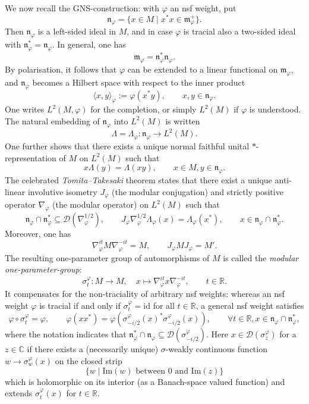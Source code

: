 \documentclass[11pt, reqno]{amsart}
\theoremstyle{definition}
\numberwithin{equation}{section}
\def\C{\mathbb C}
\def\msD{\mathscr D}
\def\R{\mathbb R}
\newcommand{\id}{\mathrm{id}}
\newcommand{\Imm}{\mathrm{Im}}
\newcommand{\mfm}{\mathfrak{m}}
\newcommand{\mfn}{\mathfrak{n}}
\begin{document}
We now recall the GNS-construction: with $\varphi$ an nsf weight, put 
\[
\mfn_{\varphi} = \{x\in M \mid x^*x\in \mfm_{\varphi}^+\}. 
\]
Then $\mfn_{\varphi}$ is a left-sided ideal in $M$, and in case $\varphi$ is tracial also a two-sided ideal with $\mfn_{\varphi}^* = \mfn_{\varphi}$. In general, one has 
\[
\mfm_{\varphi}= \mfn_{\varphi}^*\mfn_{\varphi}. 
\]
By polarisation, it follows that $\varphi$ can be extended to a linear functional on $\mfm_{\varphi}$, and $\mfn_{\varphi}$ becomes a Hilbert space with respect to the inner product 
\[
\langle x,y \rangle_{\varphi} :=\varphi(x^*y),\qquad x,y\in \mfn_{\varphi}.
\]
One writes $L^2(M,\varphi)$ for the completion, or simply $L^2(M)$ if $\varphi$ is understood. The natural embedding of $\mfn_{\varphi}$ into $L^2(M)$ is written 
\[
\Lambda = \Lambda_{\varphi}\colon  \mfn_{\varphi} \rightarrow L^2(M). 
\]
One further shows that there exists a unique normal faithful unital $*$-representation of $M$ on $L^2(M)$ such that 
\[
x\Lambda(y) = \Lambda(xy),\qquad x\in M,y\in \mfn_{\varphi}. 
\]
The celebrated \emph{Tomita--Takesaki} theorem states that there exist a unique anti-linear involutive isometry $J_{\varphi}$ (the modular conjugation) and strictly positive operator $\nabla_{\varphi}$ (the modular operator) on $L^2(M)$ such that 
\[
\mfn_{\varphi}\cap \mfn_{\varphi}^* \subseteq \msD(\nabla_{\varphi}^{1/2}),\qquad J_{\varphi}\nabla_{\varphi}^{1/2}\Lambda_{\varphi}(x) = \Lambda_{\varphi}(x^*),\qquad x\in \mfn_{\varphi}\cap \mfn_{\varphi}^*.
\]
Moreover, one has 
\[
\nabla_{\varphi}^{it}M\nabla_{\varphi}^{-it} = M,\qquad J_{\varphi} M J_{\varphi} = M'. 
\]
The resulting one-parameter group of automorphisms of $M$ is called the \emph{modular} \emph{one-parameter-group}: 
\[
\sigma_t^{\varphi}\colon  M \rightarrow M,\quad x \mapsto \nabla_{\varphi}^{it}x\nabla_{\varphi}^{-it},\qquad t\in \R. 
\]
It compensates for the non-traciality of arbitrary nsf weights: whereas an nsf weight $\varphi$ is tracial if and only if $\sigma_t^{\varphi} = \id$ for all $t\in \R$, a general nsf weight satisfies
\[
\varphi \circ \sigma_t^{\varphi}= \varphi,\qquad \varphi(xx^*) = \varphi(\sigma_{-i/2}^{\varphi}(x)^*\sigma_{-i/2}^{\varphi}(x)),\qquad \forall t\in \R,x\in \mfn_{\varphi}\cap \mfn_{\varphi}^*,
\]
where the notation indicates that $\mfn_{\varphi}^*\cap\mfn_{\varphi} \subseteq \msD(\sigma_{-i/2}^{\varphi})$. Here $x\in \msD(\sigma_{z}^{\varphi})$ for a $z\in \C$ if there exists a (necessarily unique) $\sigma$-weakly continuous function $w \rightarrow \sigma_w^{\varphi}(x)$ on the closed strip 
\[
\{w \mid \Imm(w) \textrm{ between }0\textrm{ and }\Imm(z)\}
\]
which is holomorphic on its interior (as a Banach-space valued function) and extends $\sigma_t^{\varphi}(x)$ for $t\in \R$. 
\end{document}
